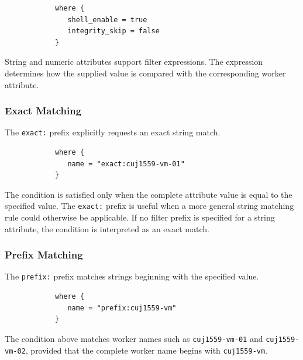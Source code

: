 \documentclass[11pt,a4paper]{article}
\begin{document}
    \begin{center}
        \begin{verbatim}
            where {
               shell_enable = true
               integrity_skip = false
            }
        \end{verbatim}
    \end{center}

    String and numeric attributes support filter expressions.
    The expression determines how the supplied value is compared with the corresponding worker attribute.

    \subsubsection{Exact Matching}

    The \texttt{exact:} prefix explicitly requests an exact string match.

    \begin{center}
        \begin{verbatim}
            where {
               name = "exact:cuj1559-vm-01"
            }
        \end{verbatim}
    \end{center}

    The condition is satisfied only when the complete attribute value is equal to the specified value.
    The \texttt{exact:} prefix is useful when a more general string matching rule could otherwise be applicable.
    If no filter prefix is specified for a string attribute, the condition
    is interpreted as an exact match.

    \subsubsection{Prefix Matching}

    The \texttt{prefix:} prefix matches strings beginning with the specified value.

    \begin{center}
        \begin{verbatim}
            where {
               name = "prefix:cuj1559-vm"
            }
        \end{verbatim}
    \end{center}

    The condition above matches worker names such as \texttt{cuj1559-vm-01} and \texttt{cuj1559-vm-02}, provided that the complete worker name begins with \texttt{cuj1559-vm}.
\end{document}
